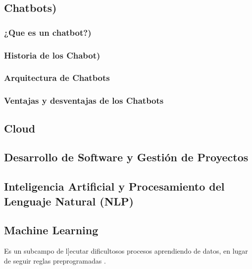 



 \subsection{Chatbots)}
	\subsubsection{¿Que es un chatbot?)}
	\subsubsection{Historia de los Chabot)}
	\subsubsection{Arquitectura de Chatbots}
	 \subsubsection{Ventajas y desventajas de los Chatbots}
 \subsection{Cloud}

 \subsection{Desarrollo de Software y Gestión de Proyectos}


 \subsection{Inteligencia Artificial y Procesamiento del Lenguaje Natural (NLP)}

\subsection{Machine Learning}
 Es un subcampo de l]ecutar dificultosos procesos aprendiendo de datos, en lugar de seguir reglas preprogramadas \parencite{tec_royal2017machine}.

